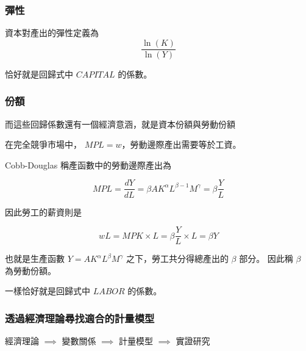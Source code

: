\begin{frame}
    \frametitle{彈性}

    資本對產出的彈性定義為
    \begin{equation*}
        \frac{\ln(K)}{\ln(Y)}
    \end{equation*}

    恰好就是回歸式中 $CAPITAL$ 的係數。 
\end{frame}

\begin{frame}
    \frametitle{份額}
    而這些回歸係數還有一個經濟意涵，就是資本份額與勞動份額

    在完全競爭市場中， $MPL = w$，勞動邊際產出需要等於工資。

    Cobb-Douglas 稱產函數中的勞動邊際產出為

    \begin{equation*}
       MPL = \frac{dY}{dL} = \beta A K^{\alpha} L^{\beta - 1} M^{\gamma} = \beta \frac{Y}{L}
    \end{equation*}

    因此勞工的薪資則是

    \begin{equation*}
        wL = MPK \times L  = \beta \frac{Y}{L} \times L = \beta Y
    \end{equation*}

    也就是生產函數 $Y=A K^{\alpha} L^{\beta} M^{\gamma}$ 之下，勞工共分得總產出的 $\beta$ 部分。
    因此稱 $\beta$ 為勞動份額。

    一樣恰好就是回歸式中 $LABOR$ 的係數。
\end{frame}

\begin{frame}
    \frametitle{透過經濟理論尋找適合的計量模型}

    經濟理論 $\implies$ 變數關係 $\implies$ 計量模型 $\implies$ 實證研究

\end{frame}